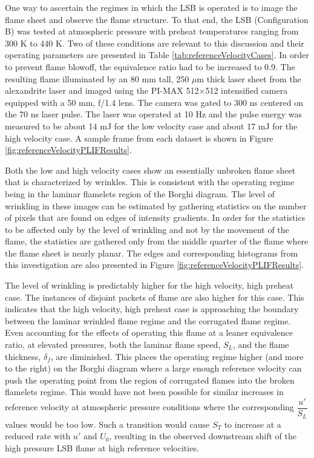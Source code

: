 One way to ascertain the regimes in which the LSB is operated is to image the flame sheet and observe the flame structure.
To that end, the LSB (Configuration B) was tested at atmospheric pressure with preheat temperatures ranging from 300 K to 440 K.
Two of these conditions are relevant to this discussion and their operating parameters are presented in Table \ref{tab:referenceVelocityCases}.
In order to prevent flame blowoff, the equivalence ratio had to be increased to 0.9.
The resulting flame illuminated by an 80 mm tall, 250 \(\mu\)m thick laser sheet from the alexandrite laser and imaged using the PI-MAX 512\(\times\)512 intensified camera equipped with a 50 mm, f/1.4 lens.
The camera was gated to 300 ns centered on the 70 ns laser pulse.
The laser was operated at 10 Hz and the pulse energy was measured to be about 14 mJ for the low velocity case and about 17 mJ for the high velocity case.
A sample frame from each dataset is shown in Figure \ref{fig:referenceVelocityPLIFResults}. 

Both the low and high velocity cases show an essentially unbroken flame sheet that is characterized by wrinkles.
This is consistent with the operating regime being in the laminar flamelets region of the Borghi diagram.
The level of wrinkling in these images can be estimated by gathering statistics on the number of pixels that are found on edges of intensity gradients.
In order for the statistics to be affected only by the level of wrinkling and not by the movement of the flame, the statistics are gathered only from the middle quarter of the flame where the flame sheet is nearly planar.
The edges and corresponding histograms from this investigation are also presented in Figure \ref{fig:referenceVelocityPLIFResults}.

The level of wrinkling is predictably higher for the high velocity, high preheat case.
The instances of disjoint packets of flame are also higher for this case.
This indicates that the high velocity, high preheat case is approaching the boundary between the laminar wrinkled flame regime and the corrugated flame regime.
Even accounting for the effects of operating this flame at a leaner equivalence ratio, at elevated pressures, both the laminar flame speed, \(S_L\), and the flame thickness, \(\delta_f\), are diminished.
This places the operating regime higher (and more to the right) on the Borghi diagram where a large enough reference velocity can push the operating point from the region of corrugated flames into the broken flamelets regime.
This would have not been possible for similar increases in reference velocity at atmospheric pressure conditions where the corresponding \(\dfrac{ u' }{ S_L }\) values would be too low.
Such a transition would cause \(S_T\) to increase at a reduced rate with \(u'\) and \(U_0\), resulting in the observed downstream shift of the high pressure LSB flame at high reference velocities.

